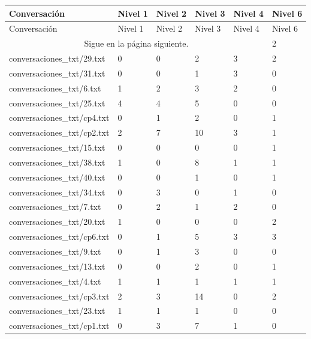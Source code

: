 \begin{center}
\begin{longtable}{|l|l|l|l|l|l|}

\hline
Conversaci\'on & Nivel 1 & Nivel 2 & Nivel 3 & Nivel 4 & Nivel 6 \\
\hline
\endfirsthead

\hline
Conversaci\'on & Nivel 1 & Nivel 2 & Nivel 3 & Nivel 4 & Nivel 6 \\
\hline
\endhead

\multicolumn{5}{c}{Sigue en la página siguiente.}
\endfoot

\endlastfoot

conversaciones\_txt/8.txt & 2 & 3 & 1 & 0 & 0 \\
\hline
conversaciones\_txt/29.txt & 0 & 0 & 2 & 3 & 2 \\
\hline
conversaciones\_txt/31.txt & 0 & 0 & 1 & 3 & 0 \\
\hline
conversaciones\_txt/6.txt & 1 & 2 & 3 & 2 & 0 \\
\hline
conversaciones\_txt/25.txt & 4 & 4 & 5 & 0 & 0 \\
\hline
conversaciones\_txt/cp4.txt & 0 & 1 & 2 & 0 & 1 \\
\hline
conversaciones\_txt/cp2.txt & 2 & 7 & 10 & 3 & 1 \\
\hline
conversaciones\_txt/15.txt & 0 & 0 & 0 & 0 & 1 \\
\hline
conversaciones\_txt/38.txt & 1 & 0 & 8 & 1 & 1 \\
\hline
conversaciones\_txt/40.txt & 0 & 0 & 1 & 0 & 1 \\
\hline
conversaciones\_txt/34.txt & 0 & 3 & 0 & 1 & 0 \\
\hline
conversaciones\_txt/7.txt & 0 & 2 & 1 & 2 & 0 \\
\hline
conversaciones\_txt/20.txt & 1 & 0 & 0 & 0 & 2 \\
\hline
conversaciones\_txt/cp6.txt & 0 & 1 & 5 & 3 & 3 \\
\hline
conversaciones\_txt/9.txt & 0 & 1 & 3 & 0 & 0 \\
\hline
conversaciones\_txt/13.txt & 0 & 0 & 2 & 0 & 1 \\
\hline
conversaciones\_txt/4.txt & 1 & 1 & 1 & 1 & 1 \\
\hline
conversaciones\_txt/cp3.txt & 2 & 3 & 14 & 0 & 2 \\
\hline
conversaciones\_txt/23.txt & 1 & 1 & 1 & 0 & 0 \\
\hline
conversaciones\_txt/cp1.txt & 0 & 3 & 7 & 1 & 0 \\

\end{longtable}
\end{center}
